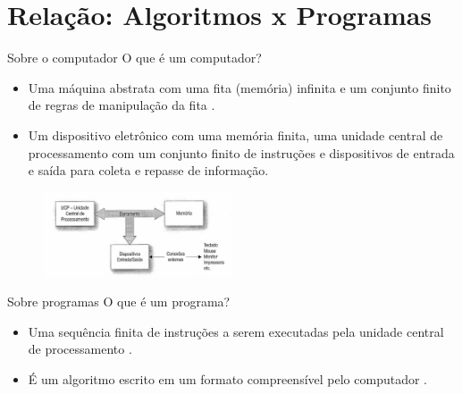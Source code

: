 \section{Relação: Algoritmos x Programas}

\begin{frame}{Sobre o computador}
  O que é um computador?
  \pause
  \begin{itemize}
    \item Uma máquina abstrata com uma fita (memória) infinita e um conjunto finito de regras de manipulação da fita \cite{turing1938computable}.
    \pause
    \item Um dispositivo eletrônico com uma memória finita, uma unidade central de processamento com um conjunto finito de instruções e dispositivos de entrada e saída para coleta e repasse de informação\cite{medina2006algoritmos}.
  \end{itemize}
  \pause
  \begin{figure}
    \includegraphics[width=0.5\textwidth]{figuras/Arquitetura.png}
  \end{figure}
\end{frame}


\begin{frame}{Sobre programas}
  O que é um programa?
  \begin{itemize}
    \item Uma sequência finita de instruções a serem executadas pela unidade central de processamento \cite{medina2006algoritmos}.
    \item É um algoritmo escrito em um formato compreensível pelo computador \cite{apostila2023}.
  \end{itemize}
\end{frame}

